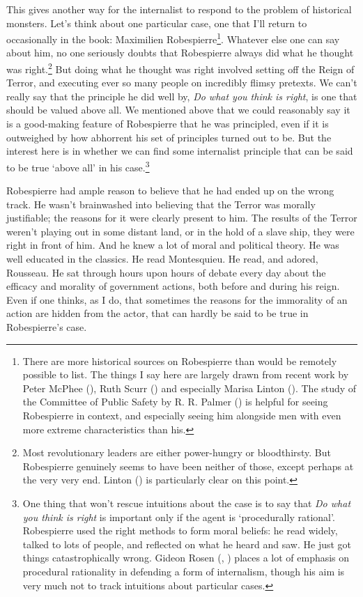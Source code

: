 \documentclass[
  10pt,
  letterpaper,
  twoside]{scrbook}
\begin{document}
This gives another way for the internalist to respond to the problem of
historical monsters. Let's think about one particular case, one that
I'll return to occasionally in the book: Maximilien
{Robespierre}\footnote{There are more historical sources on
  {Robespierre} than would be remotely possible to list. The things I
  say here are largely drawn from recent work by Peter McPhee
  (), Ruth Scurr
  () and especially Marisa Linton
  (). The study of the Committee of
  Public Safety by R. R. Palmer () is
  helpful for seeing {Robespierre} in context, and especially seeing him
  alongside men with even more extreme characteristics than his.}.
Whatever else one can say about him, no one seriously doubts that
{Robespierre} always did what he thought was right.\footnote{Most
  revolutionary leaders are either power-hungry or bloodthirsty. But
  {Robespierre} genuinely seems to have been neither of those, except
  perhaps at the very very end. Linton () is particularly clear on this point.} But doing what he
thought was right involved setting off the Reign of Terror, and
executing ever so many people on incredibly flimsy pretexts. We can't
really say that the principle he did well by, \emph{Do what you think is
right}, is one that should be valued above all. We mentioned above that
we could reasonably say it is a good-making feature of {Robespierre}
that he was principled, even if it is outweighed by how abhorrent his
set of principles turned out to be. But the interest here is in whether
we can find some internalist principle that can be said to be true
`above all' in his case.\footnote{One thing that won't rescue intuitions
  about the case is to say that \emph{Do what you think is right} is
  important only if the agent is `procedurally rational'. {Robespierre}
  used the right methods to form moral beliefs: he read widely, talked
  to lots of people, and reflected on what he heard and saw. He just got
  things catastrophically wrong. Gideon Rosen
  (, )
  places a lot of emphasis on procedural rationality in defending a form
  of internalism, though his aim is very much not to track intuitions
  about particular cases.}

{Robespierre} had ample reason to believe that he had ended up on the
wrong track. He wasn't brainwashed into believing that the Terror was
morally justifiable; the reasons for it were clearly present to him. The
results of the Terror weren't playing out in some distant land, or in
the hold of a slave ship, they were right in front of him. And he knew a
lot of moral and political theory. He was well educated in the classics.
He read Montesquieu. He read, and adored, Rousseau. He sat through hours
upon hours of debate every day about the efficacy and morality of
government actions, both before and during his reign. Even if one
thinks, as I do, that sometimes the reasons for the immorality of an
action are hidden from the actor, that can hardly be said to be true in
{Robespierre}'s case.
\end{document}
